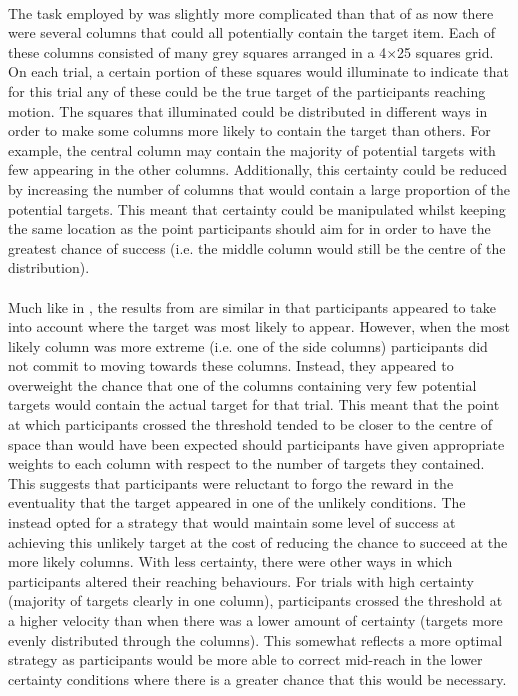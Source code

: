 \documentclass[12pt]{article}
\begin{document}
\paragraph{} The task employed by \cite{Hudson2007probmove} was slightly more complicated than that of \cite{CHAPMAN2010168} as now there were several columns that could all potentially contain the target item. Each of these columns consisted of many grey squares arranged in a 4$\times$25 squares grid. On each trial, a certain portion of these squares would illuminate to indicate that for this trial any of these could be the true target of the participants reaching motion. The squares that illuminated could be distributed in different ways in order to make some columns more likely to contain the target than others. For example, the central column may contain the majority of potential targets with few appearing in the other columns. Additionally, this certainty could be reduced by increasing the number of columns that would contain a large proportion of the potential targets. This meant that certainty could be manipulated whilst keeping the same location as the point participants should aim for in order to have the greatest chance of success (i.e. the middle column would still be the centre of the distribution). 

\paragraph{} Much like in \cite{CHAPMAN2010168}, the results from \cite{Hudson2007probmove} are similar in that participants appeared to take into account where the target was most likely to appear. However, when the most likely column was more extreme (i.e. one of the side columns) participants did not commit to moving towards these columns. Instead, they appeared to overweight the chance that one of the columns containing very few potential targets would contain the actual target for that trial. This meant that the point at which participants crossed the threshold tended to be closer to the centre of space than would have been expected should participants have given appropriate weights to each column with respect to the number of targets they contained. This suggests that participants were reluctant to forgo the reward in the eventuality that the target appeared in one of the unlikely conditions. The instead opted for a strategy that would maintain some level of success at achieving this unlikely target at the cost of reducing the chance to succeed at the more likely columns. With less certainty, there were other ways in which participants altered their reaching behaviours. For trials with high certainty (majority of targets clearly in one column), participants crossed the threshold at a higher velocity than when there was a lower amount of certainty (targets more evenly distributed through the columns). This somewhat reflects a more optimal strategy as participants would be more able to correct mid-reach in the lower certainty conditions where there is a greater chance that this would be necessary. 
\end{document}
